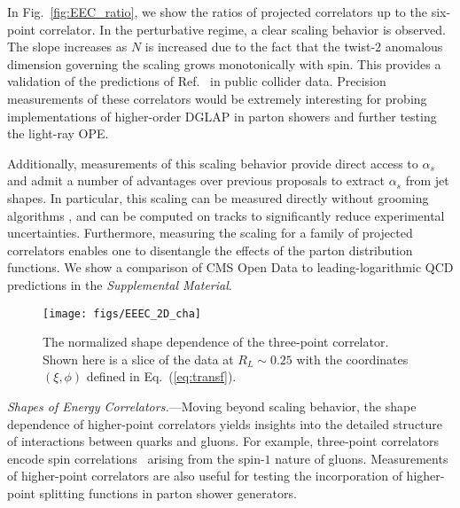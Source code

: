 \documentclass[aps,prl,twocolumn,showpacs,10pt,superscriptaddress,preprintnumbers,nofootinbib,longbibliography]{revtex4-1}
\DeclareRobustCommand{\Fig}[1]{Fig.~\ref{#1}}
\DeclareRobustCommand{\Eq}[1]{Eq.~(\ref{#1})}
\begin{document}
In \Fig{fig:EEC_ratio}, we show the ratios of projected correlators up to the six-point correlator.
%
In the perturbative regime, a clear scaling behavior is observed.
%
The slope increases as $N$ is increased due to the fact that the twist-$2$ anomalous dimension governing the scaling grows monotonically with spin.
%
This provides a validation of the predictions of Ref.~\cite{Hofman:2008ar} in public collider data.
%
Precision measurements of these correlators would be extremely interesting for probing implementations of higher-order DGLAP in parton showers \cite{Hoche:2017hno} and further testing the light-ray OPE.


Additionally, measurements of this scaling behavior provide direct access to $\alpha_s$ and admit a number of advantages over previous proposals to extract $\alpha_s$ from jet shapes.
%
In particular, this scaling can be measured directly without grooming algorithms \cite{Dasgupta:2013ihk,Larkoski:2014wba}, and can be computed on tracks to significantly reduce experimental uncertainties.
%
Furthermore, measuring the scaling for a family of projected correlators enables one to disentangle the effects of the parton distribution functions.
%
We show a comparison of CMS Open Data to leading-logarithmic QCD predictions in the \emph{Supplemental Material}.


\begin{figure}[t]
\texttt{[image: figs/EEEC\_2D\_cha]}
\caption{The normalized shape dependence of the three-point correlator. Shown here is a slice of the data at $R_L \sim 0.25$ with the coordinates $(\xi,\phi)$ defined in \Eq{eq:transf}.}
\label{fig:EEC_shape}
\end{figure}


\emph{Shapes of Energy Correlators.}---Moving beyond scaling behavior, the shape dependence of higher-point correlators yields insights into the detailed structure of interactions between quarks and gluons.
%
For example, three-point correlators encode spin correlations~\cite{Chen:2020adz,Chen:2021gdk,Karlberg:2021kwr} arising from the spin-$1$ nature of gluons.
%
Measurements of higher-point correlators are also useful for testing the incorporation of higher-point splitting functions in parton shower generators. 
\end{document}
